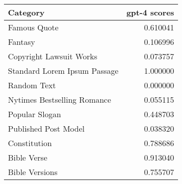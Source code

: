 \begin{tabular}{lr}
\toprule
Category & gpt-4 scores \\
\midrule
Famous Quote & 0.610041 \\
Fantasy & 0.106996 \\
Copyright Lawsuit Works & 0.073757 \\
Standard Lorem Ipsum Passage & 1.000000 \\
Random Text & 0.000000 \\
Nytimes Bestselling Romance & 0.055115 \\
Popular Slogan & 0.448703 \\
Published Post Model & 0.038320 \\
Constitution & 0.788686 \\
Bible Verse & 0.913040 \\
Bible Versions & 0.755707 \\
\bottomrule
\end{tabular}
